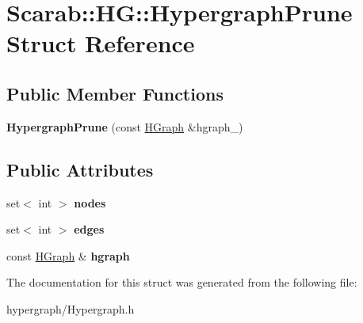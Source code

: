 \hypertarget{structScarab_1_1HG_1_1HypergraphPrune}{
\section{Scarab::HG::HypergraphPrune Struct Reference}
\label{structScarab_1_1HG_1_1HypergraphPrune}
}
\subsection*{Public Member Functions}
\begin{DoxyCompactItemize}
\item 
\hypertarget{structScarab_1_1HG_1_1HypergraphPrune_adc29528f39ad9ced03be8b48341c3e84}{
{\bfseries HypergraphPrune} (const \hyperlink{classScarab_1_1HG_1_1HGraph}{HGraph} \&hgraph\_\-)}
\label{structScarab_1_1HG_1_1HypergraphPrune_adc29528f39ad9ced03be8b48341c3e84}

\end{DoxyCompactItemize}
\subsection*{Public Attributes}
\begin{DoxyCompactItemize}
\item 
\hypertarget{structScarab_1_1HG_1_1HypergraphPrune_a1ff0fd7b723f888db33ae542d186d0b4}{
set$<$ int $>$ {\bfseries nodes}}
\label{structScarab_1_1HG_1_1HypergraphPrune_a1ff0fd7b723f888db33ae542d186d0b4}

\item 
\hypertarget{structScarab_1_1HG_1_1HypergraphPrune_adff9a55407cd2cff9199d440ef513029}{
set$<$ int $>$ {\bfseries edges}}
\label{structScarab_1_1HG_1_1HypergraphPrune_adff9a55407cd2cff9199d440ef513029}

\item 
\hypertarget{structScarab_1_1HG_1_1HypergraphPrune_a55f12db438013ace2d307efb284bcb7b}{
const \hyperlink{classScarab_1_1HG_1_1HGraph}{HGraph} \& {\bfseries hgraph}}
\label{structScarab_1_1HG_1_1HypergraphPrune_a55f12db438013ace2d307efb284bcb7b}

\end{DoxyCompactItemize}


The documentation for this struct was generated from the following file:\begin{DoxyCompactItemize}
\item 
hypergraph/Hypergraph.h\end{DoxyCompactItemize}
